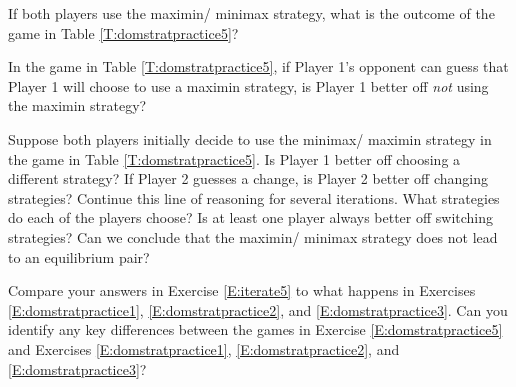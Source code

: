 \begin{xca} 
If both players use the maximin/ minimax strategy, what is the outcome of the game in Table \ref{T:domstratpractice5}? 
\end{xca}


\begin{xca} 
In the game in Table \ref{T:domstratpractice5}, if Player 1's opponent can guess that Player 1 will choose to use a maximin strategy, is Player 1 better off \emph{not} using the maximin strategy?
\end{xca}

\begin{xca}\label{E:iterate5}
Suppose both players initially decide to use the minimax/ maximin strategy in the game in Table \ref{T:domstratpractice5}. Is Player 1 better off choosing a different strategy? If Player 2 guesses a change, is Player 2 better off changing strategies? Continue this line of reasoning for several iterations. What strategies do each of the players choose? Is at least one player always better off switching strategies? Can we conclude that the maximin/ minimax strategy does not lead to an equilibrium pair?
\end{xca}


\begin{xca}
Compare your answers in Exercise \ref{E:iterate5} to what happens in Exercises \ref{E:domstratpractice1},  \ref{E:domstratpractice2}, and \ref{E:domstratpractice3}. Can you identify any key differences between the games in Exercise \ref{E:domstratpractice5} and Exercises \ref{E:domstratpractice1},  \ref{E:domstratpractice2}, and \ref{E:domstratpractice3}?
   
\end{xca}

 